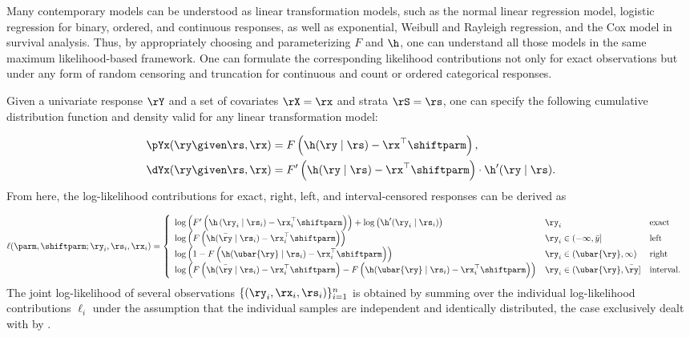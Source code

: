 Many contemporary models can be understood as linear transformation models,
such as the normal linear regression model, logistic regression for binary,
ordered, and continuous responses, as well as exponential, Weibull and Rayleigh
regression, and the Cox model in survival analysis. Thus, by appropriately choosing
and parameterizing $F$ and $\h$, one can understand all those models in the same
maximum likelihood-based framework. One can formulate the corresponding likelihood
contributions not only for exact observations but under any form of random 
censoring and truncation for continuous and count or ordered categorical
responses.

Given a univariate response $\rY$ and a set of covariates $\rX = \rx$ and strata
$\rS = \rs$, one can specify the following cumulative distribution function and 
density valid for any linear transformation model:

\begin{align*}
  \begin{aligned}
  	\pYx(\ry \given \rs, \rx) &= F\left(\h(\ry \mid \rs) - \rx^\top \shiftparm \right), \\
  	\dYx(\ry \given \rs, \rx) &= F'\left(\h(\ry \mid \rs) - \rx^\top \shiftparm \right)
  	\cdot \h'(\ry \mid \rs).
  \end{aligned}
\end{align*}
From here, the log-likelihood contributions for exact, right, left, and interval-censored 
responses can be derived as

\begin{align*}
  \begin{aligned}
  	\ell(\parm,\shiftparm;\ry_i, \rs_i, \rx_i) &=
  	\left\{
  	\begin{array}{lll}
  	  \log\left(F'\left(\h\left(\ry_i \mid \rs_i \right) - \rx_i^\top \shiftparm
  	  \right)\right) + \log\left(\h'(\ry_i \mid \rs_i)\right) & \ry_i & \text{exact}\\
  	  \log\left(F\left(\h(\bar{\ry} \mid \rs_i) - \rx_i^\top \shiftparm\right)
  	  \right) & \ry_i  \in (-\infty, \bar{y}] & \text{left} \\
  	   \log\left(1 -
  	  F\left(\h(\ubar{\ry} \mid \rs_i) - \rx_i^\top \shiftparm\right)\right) &
  	  \ry_i \in (\ubar{\ry}, \infty) & \text{right} \\
  	  \log\left(F\left(\h(\bar{\ry} \mid \rs_i) - \rx_i^\top \shiftparm\right) -
  	  F\left(\h(\ubar{\ry} \mid \rs_i) - \rx_i^\top \shiftparm\right)\right) &
  	  \ry_i \in (\ubar{\ry}, \bar{\ry}] & \text{interval}.  \\
  	\end{array}
  	\right.
  \end{aligned}
\end{align*}
The joint log-likelihood of several observations $\{(\ry_i, \rx_i, \rs_i)\}_{i=1}^n$ is obtained
by summing over the individual log-likelihood contributions $\ell_i$ under the
assumption that the individual samples are independent and identically
distributed, the case exclusively dealt with by .

